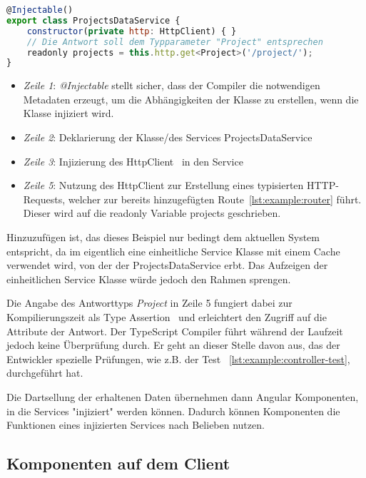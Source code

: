 \begin{lstlisting}[language=JavaScript,float=h!,caption={Funktion zum Abruf aller Projekte vom Server}, label={lst:example:service}]
@Injectable()
export class ProjectsDataService {
    constructor(private http: HttpClient) { }
    // Die Antwort soll dem Typparameter "Project" entsprechen
    readonly projects = this.http.get<Project>('/project/');
}
\end{lstlisting}

\begin{itemize}
    \setlength\itemsep{-1em}
    \item \emph{Zeile 1}: \emph{@Injectable} stellt sicher, dass der Compiler die notwendigen Metadaten erzeugt, um die Abhängigkeiten der Klasse zu erstellen, wenn die Klasse injiziert wird.
    \item \emph{Zeile 2}: Deklarierung der Klasse/des Services ProjectsDataService
    \item \emph{Zeile 3}: Injizierung des HttpClient~\cite{angular-http} in den Service
    \item \emph{Zeile 5}: Nutzung des HttpClient zur Erstellung eines typisierten HTTP-Requests, welcher zur bereits hinzugefügten Route~\ref{lst:example:router} führt.
    Dieser wird auf die readonly Variable projects geschrieben.
\end{itemize}

Hinzuzufügen ist, das dieses Beispiel nur bedingt dem aktuellen System entspricht, da im eigentlich eine einheitliche Service Klasse mit einem Cache verwendet wird, von der der ProjectsDataService erbt. Das Aufzeigen der einheitlichen Service Klasse würde jedoch den Rahmen sprengen.

Die Angabe des Antworttyps \emph{Project} in Zeile 5 fungiert dabei zur Kompilierungszeit als Type Assertion~\cite{typescript-typeassertion}
und erleichtert den Zugriff auf die Attribute der Antwort. Der TypeScript Compiler führt während der Laufzeit jedoch keine Überprüfung durch.
Er geht an dieser Stelle davon aus, das der Entwickler spezielle Prüfungen, wie z.B. der Test ~\ref{lst:example:controller-test}, durchgeführt hat.

Die Dartsellung der erhaltenen Daten übernehmen dann Angular Komponenten, in die Services "injiziert" werden können.
Dadurch können Komponenten die Funktionen eines injizierten Services nach Belieben nutzen.

\subsection{Komponenten auf dem Client}
\label{sec:requirements:example:component}

